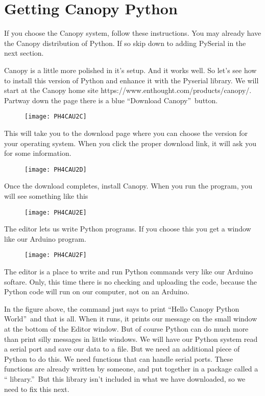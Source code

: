 \section{Getting Canopy Python}

If you choose the Canopy system, follow these instructions. You may already
have the Canopy distribution of Python. If so skip down to adding PySerial
in the next section.

Canopy is a little more polished in it's setup. And it works well. So let's
see how to install this version of Python and enhance it with the Pyserial
library. We will start at the Canopy home site
https://www.enthought.com/products/canopy/. Partway down the page there is a
blue \textquotedblleft Download Canopy\textquotedblright\ button.

\begin{figure}[h!]
\texttt{[image: PH4CAU2C]}
\end{figure}This will take you to the
download page where you can choose the version for your operating system.
When you click the proper download link, it will ask you for some
information. \begin{figure}[h!]
\texttt{[image: PH4CAU2D]}
\end{figure}

Once the download completes, install Canopy. When you run the program, you
will see something like this\begin{figure}[h!]
\texttt{[image: PH4CAU2E]}
\end{figure}

The editor lets us write Python programs. If you choose this you get a
window like our Arduino program. \begin{figure}[h!]
\texttt{[image: PH4CAU2F]}
\end{figure}The editor is a place to write
and run Python commands very like our Arduino softare. Only, this time there
is no checking and uploading the code, because the Python code will run on
our computer, not on an Arduino.

In the figure above, the command just says to print \textquotedblleft Hello
Canopy Python World\textquotedblright\ and that is all. When it runs, it
prints our message on the small window at the bottom of the Editor window.
But of course Python can do much more than print silly messages in little
windows. We will have our Python system read a serial port and save our data
to a file. But we need an additional piece of Python to do this. We need
functions that can handle serial ports. These functions are already written
by someone, and put together in a package called a \textquotedblleft
library.\textquotedblright\ But this library isn't included in what we have
downloaded, so we need to fix this next.


